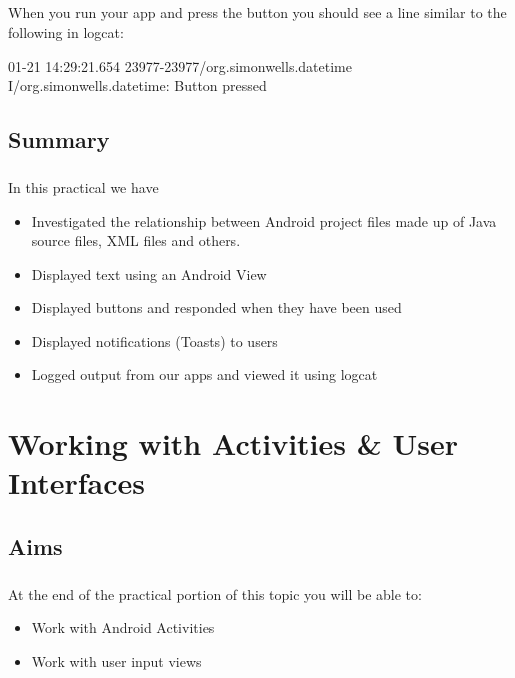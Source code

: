 \documentclass[12pt, a4paper, twoside]{book}
\begin{document}
\paragraph{} When you run your app and press the button you should see a line similar to the following in logcat:

\begin{framed}
{\scriptsize{
01-21 14:29:21.654 23977-23977/org.simonwells.datetime I/org.simonwells.datetime: Button pressed
}}
\end{framed}

\section{Summary}
\paragraph{} In this practical we have 

\begin{itemize}
\item Investigated the relationship between Android project files made up of Java source files, XML files and others.
\item Displayed text using an Android View
\item Displayed buttons and responded when they have been used
\item Displayed notifications (Toasts) to users
\item Logged output from our apps and viewed it using logcat
\end{itemize}





\chapter{Working with Activities \& User Interfaces}

\section{Aims}
\paragraph{} At the end of the practical portion of this topic you will be able to:

\begin{itemize}
\item Work with Android Activities
\item Work with user input views
\end{itemize}
\end{document}
